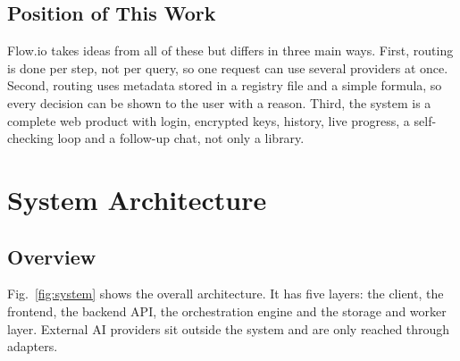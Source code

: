 \documentclass[conference]{IEEEtran}
\begin{document}
\subsection{Position of This Work}
Flow.io takes ideas from all of these but differs in three main ways. First, routing is done per step,
not per query, so one request can use several providers at once. Second, routing uses metadata stored in
a registry file and a simple formula, so every decision can be shown to the user with a reason. Third,
the system is a complete web product with login, encrypted keys, history, live progress, a self-checking
loop and a follow-up chat, not only a library.

\section{System Architecture}

\subsection{Overview}
Fig.~\ref{fig:system} shows the overall architecture. It has five layers: the client, the frontend, the
backend API, the orchestration engine and the storage and worker layer. External AI providers sit
outside the system and are only reached through adapters.
\end{document}
